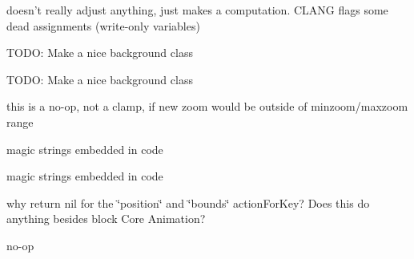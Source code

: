 \begin{DoxyRefList}
\item[\label{bug__bug000015}%
\hypertarget{bug__bug000015}{}%
成员 \hyperlink{interface_r_m_map_contents_a08e2f802b9fa6d0cfe3478725684545e}{\mbox{[}R\-M\-Map\-Contents adjust\-Zoom\-For\-Bounding\-Mask\-:\mbox{]}} ]doesn't really adjust anything, just makes a computation. C\-L\-A\-N\-G flags some dead assignments (write-\/only variables)  
\item[\label{bug__bug000014}%
\hypertarget{bug__bug000014}{}%
成员 \hyperlink{interface_r_m_map_contents_ac88a327e2895d4d95c9fc829ab99294d}{\mbox{[}R\-M\-Map\-Contents init\-For\-View\-:With\-Tile\-Source\-:With\-Renderer\-:Looking\-At\-:\mbox{]}} ]T\-O\-D\-O\-: Make a nice background class  
\item[\label{bug__bug000013}%
\hypertarget{bug__bug000013}{}%
成员 \hyperlink{interface_r_m_map_contents_a6196963182efcdf037319e622f4ca2d8}{\mbox{[}R\-M\-Map\-Contents init\-With\-View\-:tilesource\-:center\-Lat\-Lon\-:zoom\-Level\-:max\-Zoom\-Level\-:min\-Zoom\-Level\-:background\-Image\-:screen\-Scale\-:\mbox{]}} ]T\-O\-D\-O\-: Make a nice background class  
\item[\label{bug__bug000016}%
\hypertarget{bug__bug000016}{}%
成员 \hyperlink{interface_r_m_map_contents_ac84735b91375863f930ce3465411a85f}{\mbox{[}R\-M\-Map\-Contents zoom\-By\-Factor\-:near\-:\mbox{]}} ]this is a no-\/op, not a clamp, if new zoom would be outside of minzoom/maxzoom range  
\item[\label{bug__bug000017}%
\hypertarget{bug__bug000017}{}%
成员 \hyperlink{category_r_m_map_contents_07_private_methods_08_a1708db1594b0c789a0da60237477de73}{\mbox{[}R\-M\-Map\-Contents(Private\-Methods) animated\-Zoom\-Step\-:\mbox{]}} ]magic strings embedded in code  
\item[\label{bug__bug000017}%
\hypertarget{bug__bug000017}{}%
成员 \hyperlink{category_r_m_map_contents_07_private_methods_08_a1708db1594b0c789a0da60237477de73}{\mbox{[}R\-M\-Map\-Contents(Private\-Methods) animated\-Zoom\-Step\-:\mbox{]}} ]magic strings embedded in code  
\item[\label{bug__bug000018}%
\hypertarget{bug__bug000018}{}%
成员 \hyperlink{interface_r_m_map_layer_a28e0dabc0cf8638c6d26358354f4fcf8}{\mbox{[}R\-M\-Map\-Layer action\-For\-Key\-:\mbox{]}} ]why return nil for the \char`\"{}position\char`\"{} and \char`\"{}bounds\char`\"{} action\-For\-Key? Does this do anything besides block Core Animation?  
\item[\label{bug__bug000021}%
\hypertarget{bug__bug000021}{}%
成员 \hyperlink{interface_r_m_map_renderer_a0f3802416a587d84d9b04b289f577190}{\mbox{[}R\-M\-Map\-Renderer draw\-Rect\-:\mbox{]}} ]no-\/op  

\end{DoxyRefList}
